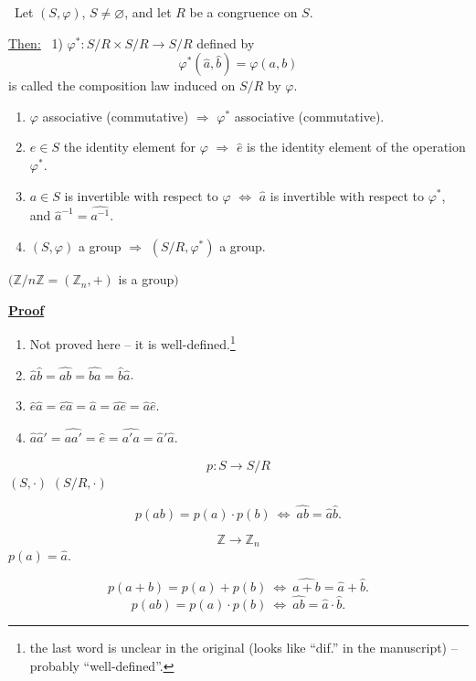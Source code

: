 \noindent{} \ Let $(S,\varphi)$, $S\neq\varnothing$, and let $R$ be a congruence on $S$.

\bigskip
\noindent\underline{Then:} \ 1) $\varphi^* : S/R\times S/R \to S/R$ defined by
\[
\varphi^*(\hat a,\hat b) = \varphi(a,b)
\]
is called the composition law induced on $S/R$ by $\varphi$.

\begin{enumerate}
\item[(2)] $\varphi$ associative (commutative) $\Rightarrow$ $\varphi^*$ associative (commutative).
\item[(3)] $e\in S$ the identity element for $\varphi$ $\Rightarrow$ $\hat e$ is the identity element of the operation $\varphi^*$.
\item[(4)] $a\in S$ is invertible with respect to $\varphi$ $\Leftrightarrow$ $\hat a$ is invertible with respect to $\varphi^*$, and $\hat a^{-1} = \widehat{a^{-1}}$.
\item[(5)] $(S,\varphi)$ a group $\Rightarrow$ $(S/R,\varphi^*)$ a group.
\end{enumerate}

\noindent $\big(\mathbb{Z}/n\mathbb{Z} = (\mathbb{Z}_n,+)$ is a group$\big)$

\bigskip
\noindent\underline{\textbf{Proof}}

\begin{enumerate}
\item[(1)] Not proved here -- it is well-defined.\footnote{the last word is unclear in the original (looks like ``dif.'' in the manuscript) -- probably ``well-defined''.}
\item[(2)] $\hat a\hat b = \widehat{ab} = \widehat{ba} = \hat b\hat a$.
\item[(3)] $\hat e\hat a = \widehat{ea} = \hat a = \widehat{ae} = \hat a\hat e$.
\item[(4)] $\hat a\hat a' = \widehat{aa'} = \hat e = \widehat{a'a} = \hat a'\hat a$.
\end{enumerate}

\[
p : S \to S/R
\]
\noindent $(S,\cdot)$ \hspace{2cm} $(S/R,\cdot)$

\[
p(ab) = p(a)\cdot p(b) \ \Leftrightarrow\ \widehat{ab} = \hat a\hat b.
\]

\[
\mathbb{Z} \to \mathbb{Z}_n
\]
\noindent $p(a) = \hat a$.

\[
p(a+b) = p(a)+p(b) \ \Leftrightarrow\ \widehat{a+b} = \hat a+\hat b.
\]
\[
p(ab) = p(a)\cdot p(b) \ \Leftrightarrow\ \widehat{ab} = \hat a\cdot\hat b.
\]